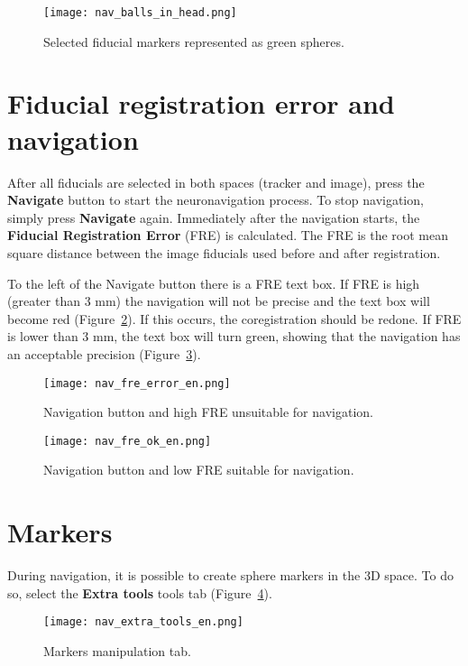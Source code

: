 \begin{figure}[!htb]
\centering
\texttt{[image: nav\_balls\_in\_head.png]}
\caption{Selected fiducial markers represented as green spheres.}
\label{fig:nav_balls_in_head}
\end{figure}


\section{Fiducial registration error and navigation}

After all fiducials are selected in both spaces (tracker and image), press the \textbf{Navigate} button to start the neuronavigation process. To stop navigation, simply press \textbf{Navigate} again. Immediately after the navigation starts, the \textbf{Fiducial Registration Error} (FRE) is calculated. The FRE is the root mean square distance between the image fiducials used before and after registration.


To the left of the Navigate button there is a FRE text box. If FRE is high (greater than 3 mm) the navigation will not be precise and the text box will become red (Figure~\ref{fig:nav_fre_error}). If this occurs, the coregistration should be redone. If FRE is lower than 3 mm, the text box will turn green, showing that the navigation has an acceptable precision (Figure~\ref{fig:nav_fre_ok}).

\begin{figure}[!htb]
\centering
\texttt{[image: nav\_fre\_error\_en.png]}
\caption{Navigation button and high FRE unsuitable for navigation.}
\label{fig:nav_fre_error}
\end{figure}

\begin{figure}[!htb]
\centering
\texttt{[image: nav\_fre\_ok\_en.png]}
\caption{Navigation button and low FRE suitable for navigation.}
\label{fig:nav_fre_ok}
\end{figure}

\section{Markers}

During navigation, it is possible to create sphere markers in the 3D space. To do so, select the \textbf{Extra tools} tools tab (Figure~\ref{fig:nav_extra_tools}).

\begin{figure}[!htb]
\centering
\texttt{[image: nav\_extra\_tools\_en.png]}
\caption{Markers manipulation tab.}
\label{fig:nav_extra_tools}
\end{figure}

